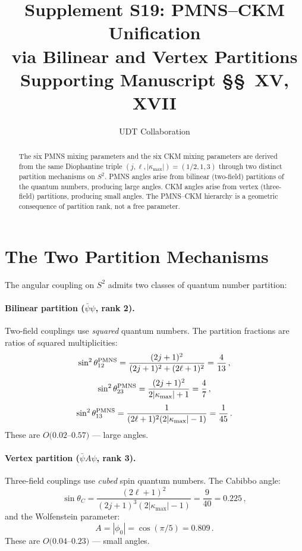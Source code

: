\documentclass[11pt,letterpaper]{article}
\title{Supplement S19: PMNS--CKM Unification \\
via Bilinear and Vertex Partitions \\
\large Supporting Manuscript \S\S~XV, XVII}
\author{UDT Collaboration}
\date{}
\numberwithin{equation}{section}
\begin{document}
\maketitle

\begin{abstract}
The six PMNS mixing parameters and the six CKM mixing parameters are
derived from the same Diophantine triple
$(j, \ell, |\kappa_{\max}|) = (1/2, 1, 3)$ through two distinct
partition mechanisms on $S^2$.  PMNS angles arise from bilinear
(two-field) partitions of the quantum numbers, producing large angles.
CKM angles arise from vertex (three-field) partitions, producing small
angles.  The PMNS--CKM hierarchy is a geometric consequence of
partition rank, not a free parameter.
\end{abstract}

\section{The Two Partition Mechanisms}

The angular coupling on $S^2$ admits two classes of quantum number
partition:

\paragraph{Bilinear partition ($\bar\psi\psi$, rank 2).}
Two-field couplings use \emph{squared} quantum numbers.  The partition
fractions are ratios of squared multiplicities:
\begin{equation}
  \sin^2\theta_{12}^{\rm PMNS} = \frac{(2j+1)^2}{(2j+1)^2 + (2\ell+1)^2}
  = \frac{4}{13}\,,
\end{equation}
\begin{equation}
  \sin^2\theta_{23}^{\rm PMNS} = \frac{(2j+1)^2}{2|\kappa_{\max}|+1}
  = \frac{4}{7}\,,
\end{equation}
\begin{equation}
  \sin^2\theta_{13}^{\rm PMNS}
  = \frac{1}{(2\ell+1)^2(2|\kappa_{\max}|-1)} = \frac{1}{45}\,.
\end{equation}
These are $O(0.02$--$0.57)$ --- large angles.

\paragraph{Vertex partition ($\bar\psi A\psi$, rank 3).}
Three-field couplings use \emph{cubed} spin quantum numbers.  The
Cabibbo angle:
\begin{equation}
  \sin\theta_C = \frac{(2\ell+1)^2}{(2j+1)^3(2|\kappa_{\max}|-1)}
  = \frac{9}{40} = 0.225\,,
\end{equation}
and the Wolfenstein parameter:
\begin{equation}
  A = |\phi_0| = \cos(\pi/5) = 0.809\,.
\end{equation}
These are $O(0.04$--$0.23)$ --- small angles.
\end{document}
